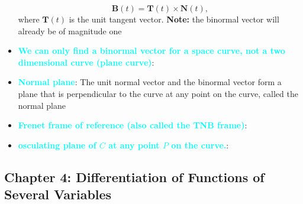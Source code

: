 \documentclass{report}
\begin{document}
\begin{itemize}
            \begin{equation}
                \mathbf{B}(t) = \mathbf{T}(t) \times \mathbf{N}(t),
            \end{equation}
            where $\mathbf{T}(t)$ is the unit tangent vector.
            \bigbreak \noindent 
            \textbf{Note:} the binormal vector will already be of magnitude one
        \item \textbf{\textcolor{cyan}{We can only find a binormal vector for a space curve, not a two dimensional curve (plane curve)}}:
        \item \textbf{\textcolor{cyan}{Normal plane}}: The unit normal vector and the binormal vector form a plane that is perpendicular to the curve at any point on the curve, called the normal plane
        \item \textbf{\textcolor{cyan}{Frenet frame of reference (also called the TNB frame)}}:
        \item \textbf{\textcolor{cyan}{osculating plane of $C$ at any point $P$ on the curve.}}:
    \end{itemize}

    \pagebreak 
    \subsection{Chapter 4: Differentiation of Functions of Several Variables}
    \bigbreak \noindent 
\end{document}
